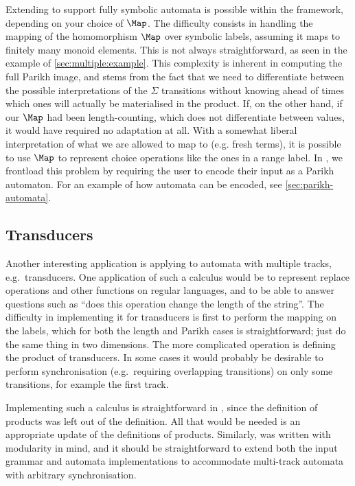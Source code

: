 Extending \Calculus{} to support fully symbolic automata is possible within the
framework, depending on your choice of $\Map$. The difficulty consists in
handling the mapping of the homomorphism $\Map$ over symbolic labels, assuming
it maps to finitely many monoid elements. This is not always straightforward, as
seen in the example of \cref{sec:multiple:example}. This complexity is inherent
in computing the full Parikh image, and stems from the fact that we need to
differentiate between the possible interpretations of the $\Sigma$ transitions
without knowing ahead of times which ones will actually be materialised in the
product. If, on the other hand, if our $\Map$ had been length-counting, which
does not differentiate between values, it would have required no adaptation at
all. With a somewhat liberal interpretation of what we are allowed to map to
(e.g. fresh terms), it is possible to use $\Map$ to represent choice operations
like the ones in a range label. In \Catra{}, we frontload this problem by
requiring the user to encode their input as a Parikh automaton. For an example of how automata can be encoded, see \cref{sec:parikh-automata}.

\subsection{Transducers}\label{sec:ext:transducers}

Another interesting application is applying \Calculus{} to automata with
multiple tracks, e.g.\ transducers. One application of such a calculus would be
to represent replace operations and other functions on regular languages, and to
be able to answer questions such as \enquote{does this operation change the length of the
string}. The difficulty in implementing it for transducers is first to perform
the mapping on the labels, which for both the length and Parikh cases is
straightforward; just do the same thing in two dimensions. The more complicated
operation is defining the product of transducers. In some cases it would
probably be desirable to perform synchronisation (e.g.\ requiring overlapping
transitions) on only some transitions, for example the first track.

Implementing such a calculus is straightforward in \Calculus, since the
definition of products was left out of the definition. All that would be needed
is an appropriate update of the definitions of products. Similarly, \Catra was
written with modularity in mind, and it should be straightforward to extend both
the input grammar and automata implementations to accommodate multi-track
automata with arbitrary synchronisation.

